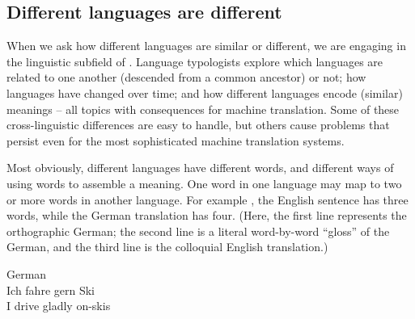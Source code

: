 


\subsection{Different languages are different}

When we ask how different languages are similar or different, we are engaging in the linguistic subfield of .  Language typologists explore which languages are related to one another (descended from a common ancestor) or not; how languages have changed over time; and how different languages encode (similar) meanings -- all topics with consequences for machine translation.  Some of these cross-linguistic differences are easy to handle, but others  cause problems that persist even for the most sophisticated machine translation systems.

Most obviously, different languages have different words, and different ways of using words to assemble a meaning.  One word in one language may map to two or more words in another language.  For example , the English sentence  has three words, while the German translation has four.    (Here, the first line represents the orthographic German; the second line is a literal word-by-word ``gloss'' of the German, and the third line is the colloquial English translation.)

\ea \label{ski} German \\
\gll Ich fahre gern Ski \\
I drive gladly on-skis \\
\z 


